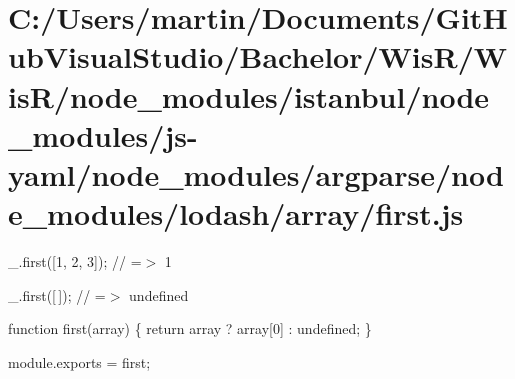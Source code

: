 \hypertarget{_c_1_2_users_2martin_2_documents_2_git_hub_visual_studio_2_bachelor_2_wis_r_2_wis_r_2node_module881fdb5322bbff5c59e003b478fd462b}{}\section{C\+:/\+Users/martin/\+Documents/\+Git\+Hub\+Visual\+Studio/\+Bachelor/\+Wis\+R/\+Wis\+R/node\+\_\+modules/istanbul/node\+\_\+modules/js-\/yaml/node\+\_\+modules/argparse/node\+\_\+modules/lodash/array/first.\+js}
\+\_\+.\+first(\mbox{[}1, 2, 3\mbox{]}); // =$>$ 1

\+\_\+.\+first(\mbox{[}$\,$\mbox{]}); // =$>$ undefined


\begin{DoxyCodeInclude}

\textcolor{keyword}{function} first(array) \{
  \textcolor{keywordflow}{return} array ? array[0] : undefined;
\}

module.exports = first;
\end{DoxyCodeInclude}
 